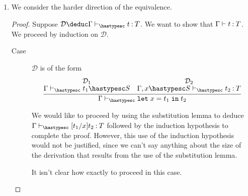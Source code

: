 \documentclass[11pt]{article}
\begin{document}
\begin{enumerate}
\begin{proof}
\begin{description}
          Then we construct the derivation
          \begin{equation*}
            \infer{
              \Gamma, \Gamma^\prime
              \phts \mathtt{let}\; x = t_1 \;\mathtt{in}\; t_2 \hastype T
            }{
              \deduce[\mathcal{F}_1]{\Gamma, \Gamma^\prime \phts t_1 \hastypesc S}{}
              &
              \deduce[\mathcal{F}_2]{
                \Gamma, \Gamma^\prime, x \hastypesc S \phts t_2 \hastype T
              }{}
            }
          \end{equation*}
          as required.
      \end{description}
    \end{proof}

  \item
    We consider the harder direction of the equivalence.

    \begin{proof}
      Suppose $\mathcal{D} \deduc \Gamma \phts t \hastype T$.
      We want to show that $\Gamma \vdash t \mathbin{:} T$.
      We proceed by induction on $\mathcal{D}$.

      \begin{description}
        \item[Case]
          $\mathcal{D}$ is of the form
          \begin{equation*}
            \infer{
              \Gamma \phts \mathtt{let}\; x = t_1 \;\mathtt{in}\; t_2
            }{
              \deduce[\mathcal{D}_1]{\Gamma \phts t_1 \hastypesc S}{}
              &
              \deduce[\mathcal{D}_2]{
                \Gamma, x \hastypesc S \phts t_2 \hastype T
              }{}
            }
          \end{equation*}

          We would like to proceed by using the substitution lemma to deduce
          $\Gamma \phts [t_1/x]t_2 \hastype T$ followed by the induction
          hypothesis to complete the proof.
          However, this use of the induction hypothesis would not be justified,
          since we can't say anything about the size of the derivation that
          results from the use of the substitution lemma.

          It isn't clear how exactly to proceed in this case.
      \end{description}
    \end{proof}
\end{enumerate}
\end{document}
